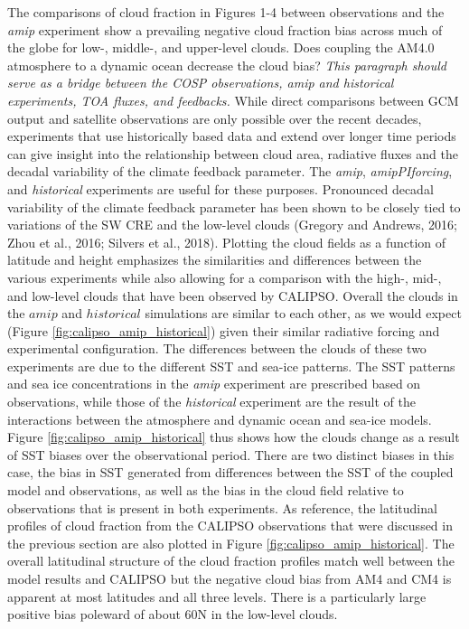\documentclass[draft]{agujournal2019}
\begin{document}
The comparisons of cloud fraction in Figures 1-4 between observations and the \textit{amip} experiment show a 
prevailing negative cloud fraction bias across much of the globe for low-, middle-, and upper-level clouds.  Does 
coupling the AM4.0 atmosphere to a dynamic ocean decrease the cloud bias?   
\textit{This paragraph should serve as a bridge between the COSP observations, amip and historical experiments, TOA fluxes, and feedbacks.}
While direct comparisons between GCM output and satellite observations are only possible over the recent decades, experiments that use
historically based data and extend over longer time periods can give insight into the relationship between cloud area, radiative fluxes
and the decadal variability of the climate feedback parameter.  The \textit{amip}, \textit{amipPIforcing}, and \textit{historical} experiments are useful
for these purposes.  Pronounced decadal variability of the climate feedback parameter has been shown to be closely tied to 
variations of the SW CRE and the low-level clouds (Gregory and Andrews, 2016; Zhou et al., 2016; Silvers et al., 2018).
Plotting the cloud fields as a function of latitude and height emphasizes the similarities and differences 
between the various experiments while also allowing for a comparison with the high-, mid-, and low-level clouds 
that have been observed by CALIPSO.  Overall the clouds in the $amip$ and $historical$ simulations are similar to 
each other, as we would expect (Figure \ref{fig:calipso_amip_historical}) given their similar radiative forcing 
and experimental configuration.  The differences between the clouds of 
these two experiments are due to the different SST and sea-ice patterns.  The SST patterns and 
sea ice concentrations in the \textit{amip} experiment are
prescribed based on observations, while those of the \textit{historical} experiment are the result of the 
interactions between the atmosphere and dynamic ocean and sea-ice models.  
Figure \ref{fig:calipso_amip_historical} thus shows how the clouds change 
as a result of SST biases over the observational period.   There are two distinct biases in this case, 
the bias in SST generated from differences between the SST of the coupled model and observations,
as well as the bias in the cloud field relative to observations that is present in both 
experiments.  As reference, the latitudinal profiles of cloud fraction from the CALIPSO observations that 
were discussed in the previous section are also plotted in  Figure \ref{fig:calipso_amip_historical}.
The overall latitudinal structure of the cloud fraction profiles match well between the model results and 
CALIPSO but the negative cloud bias from AM4 and CM4 is apparent at most latitudes and all three levels.  
There is a particularly large positive bias poleward of about 60N in the low-level clouds. 
\end{document}
